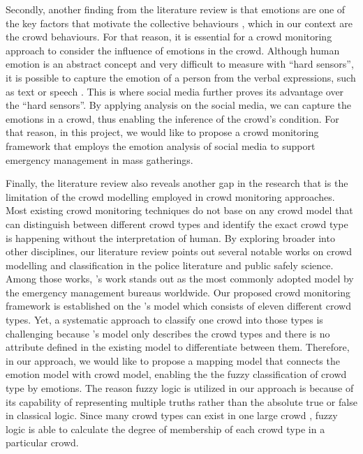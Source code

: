 Secondly, another finding from the literature review is that emotions are one of the key factors that motivate the collective behaviours \citep{Kornblum2011, jasper2011emotions}, which in our context are the crowd behaviours. For that reason, it is essential for a crowd monitoring approach to consider the influence of emotions in the crowd. Although human emotion is an abstract concept and very difficult to measure with ``hard sensors'', it is possible to capture the emotion of a person from the verbal expressions, such as text \citep{alm2005emotions} or speech \citep{sobin1999emotion}. This is where social media further proves its advantage over the ``hard sensors''. By applying analysis on the social media, we can capture the emotions in a crowd, thus enabling the inference of the crowd's condition. For that reason, in this project, we would like to propose a crowd monitoring framework that employs the emotion analysis of social media to support emergency management in mass gatherings. 

Finally, the literature review also reveals another gap in the research that is the limitation of the crowd modelling employed in crowd monitoring approaches. Most existing crowd monitoring techniques do not base on any crowd model that can distinguish between different crowd types and identify the exact crowd type is happening without the interpretation of human. By exploring broader into other disciplines, our literature review points out several notable works on crowd modelling and classification in the police literature and public safely science. Among those works, \citet{Berlonghi1995}'s work stands out as the most commonly adopted model by the emergency management bureaus worldwide. Our proposed crowd monitoring framework is established on the \citet{Berlonghi1995}'s model which consists of eleven different crowd types. Yet, a systematic approach to classify one crowd into those types is challenging because \citet{Berlonghi1995}'s model only describes the crowd types and there is no attribute defined in the existing model to differentiate between them. Therefore, in our approach, we would like to propose a mapping model that connects the emotion model with crowd model, enabling the the fuzzy classification of crowd type by emotions. The reason fuzzy logic is utilized in our approach is because of its capability of representing multiple truths rather than the absolute true or false in classical logic. Since many crowd types can exist in one large crowd \citep{Berlonghi1995}, fuzzy logic is able to calculate the degree of membership of each crowd type in a particular crowd.

